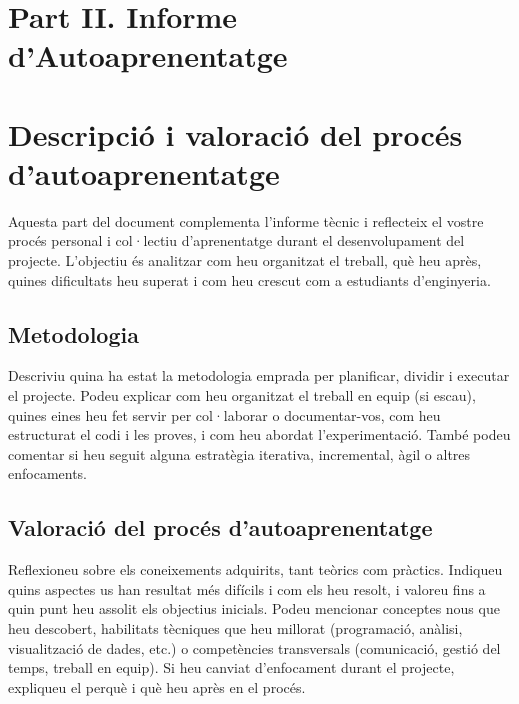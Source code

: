 \section*{\centering Part II. Informe d'Autoaprenentatge}

\section{Descripció i valoració del procés d'autoaprenentatge}

Aquesta part del document complementa l’informe tècnic i reflecteix el vostre procés personal i col·lectiu d’aprenentatge durant el desenvolupament del projecte. L’objectiu és analitzar com heu organitzat el treball, què heu après, quines dificultats heu superat i com heu crescut com a estudiants d'enginyeria.

\subsection{Metodologia}

Descriviu quina ha estat la metodologia emprada per planificar, dividir i executar el projecte. Podeu explicar com heu organitzat el treball en equip (si escau), quines eines heu fet servir per col·laborar o documentar-vos, com heu estructurat el codi i les proves, i com heu abordat l’experimentació. També podeu comentar si heu seguit alguna estratègia iterativa, incremental, àgil o altres enfocaments.

\subsection{Valoració del procés d'autoaprenentatge}

Reflexioneu sobre els coneixements adquirits, tant teòrics com pràctics. Indiqueu quins aspectes us han resultat més difícils i com els heu resolt, i valoreu fins a quin punt heu assolit els objectius inicials. Podeu mencionar conceptes nous que heu descobert, habilitats tècniques que heu millorat (programació, anàlisi, visualització de dades, etc.) o competències transversals (comunicació, gestió del temps, treball en equip). Si heu canviat d’enfocament durant el projecte, expliqueu el perquè i què heu après en el procés.
